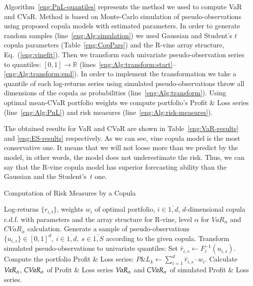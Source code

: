 Algorithm~\ref{eng:PnL-quantiles} represents the method we used to compute VaR and CVaR. Method is based on Monte-Carlo simulation of pseudo-observations using proposed copula models with estimated parameters. 
In order to generate random samples (line~\ref{eng:Alg:simulation}) we used Gaussian and Student's $t$ copula parameters (Table~\ref{eng:CopPars}) and the R-vine array structure, Eq.~(\ref{eng:vinefit}). 
Then we transform each univariate pseudo-observation series to quantiles: $[0,1] \to \mathbb{R}$  (lines~\ref{eng:Alg:transform:start}--\ref{eng:Alg:transform:end}). 
In order to implement the transformation we take a quantile of each log-returns series using simulated pseudo-observations throw all dimensions of the copula as probabilities (line~\ref{eng:Alg:transform}). 
Using optimal mean-CVaR portfolio weights we compute portfolio's Profit \& Loss series (line~\ref{eng:Alg:PnL}) and risk measures (line~\ref{eng:Alg:risk-measures}). 

The obtained results for VaR and CVaR are shown in Table~\ref{eng:VaR-results} and \ref{eng:ES-results} respectively. As we can see, 
vine copula model is the most conservative one. 
It means that we will not loose more than we predict by the model, in other words, the model does not underestimate the risk. 
Thus, we can say that the R-vine copula model has superior forecasting ability than the Gaussian and the Student's~$t$ one.

\begin{algorithm}
\caption{Computation of Risk Measures by a Copula}
\label{eng:PnL-quantiles}
\begin{algorithmic}[1]
	\Require Log-returns $\{r_{i,t}\}$, weights $w_i$ of optimal portfolio, $i \in \overline{1,d}$, $d$-dimensional copula c.d.f. with parameters and the array structure for R-vine, level $\alpha$ for $VaR_\alpha$ and $CVaR_\alpha$ calculation.
	\State Generate a sample of pseudo-observations $\{\hat{u}_{i,s}\} \in [0, 1]^d, \ i \in \overline{1,d}, \ s \in \overline{1, S}$ according to the given copula.\label{eng:Alg:simulation}
	\State Transform simulated pseudo-observations to univariate quantiles:
	\label{eng:Alg:transform:start}
            \State Set $\hat{r}_{i,s} \gets F^{-1}_i (\hat{u}_{i,s})$. 
            \label{eng:Alg:transform}
	    \EndFor
	\EndFor \label{eng:Alg:transform:end}
	\State Compute the portfolio Profit \& Loss series:
	    \State $P\&L_k \gets \sum_{i=1}^d \hat{r}_{i,s} \cdot w_i$. \label{eng:Alg:PnL}
	\EndFor
	\State Calculate $\emph{VaR}_\alpha$, $\emph{CVaR}_\alpha$ of Profit \& Loss series \label{eng:Alg:risk-measures} %
	\Ensure $\emph{VaR}_\alpha$ and $\emph{CVaR}_\alpha$ of simulated Profit \& Loss series.
\end{algorithmic}
\end{algorithm}

